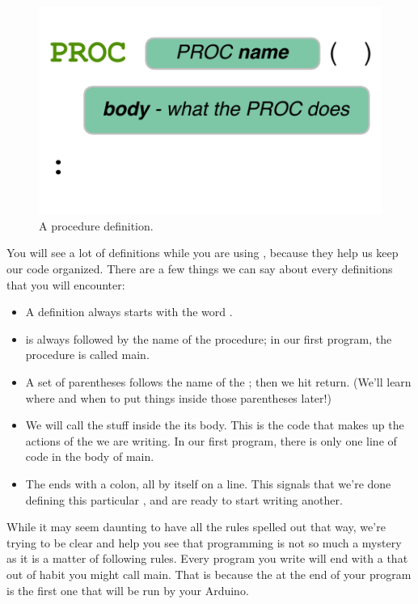 \begin{figure}[ht]
  \begin{center}
    \includegraphics[scale=1.0]{images/ch1-proc-defn-pattern}
    \caption{A procedure definition.}
    \label{pattern:ch1-proc-defn}
  \end{center}
\end{figure}
        
\newpage

You will see a lot of \PROCedure definitions while you are using \plumbing, because they help us keep our code organized. There are a few things we can say about every \PROC definitions that you will encounter:

\begin{itemize}
	\item A \PROCedure definition always starts with the word \PROC. 
	\item \PROC is always followed by the name of the procedure; in our first program, the procedure is called {\code main}. 
	\item A set of parentheses follows the name of the \PROC; then we hit return. (We'll learn where and when to put things inside those parentheses later!) 
	\item We will call the stuff inside the \PROCedure its {\strong body}. This is the code that makes up the actions of the \PROC we are writing. In our first program, there is only one line of code in the body of {\code main}.
	\item The \PROC ends with a colon, all by itself on a line. This signals that we're done defining this particular \PROC, and are ready to start writing another.
\end{itemize}

While it may seem daunting to have all the rules spelled out that way, we're trying to be clear and help you see that programming is not so much a mystery as it is a matter of following rules. Every program you write will end with a \PROC that out of habit you might call {\code main}. That is because the \PROC at the end of your program is the first one that will be run by your Arduino. %

